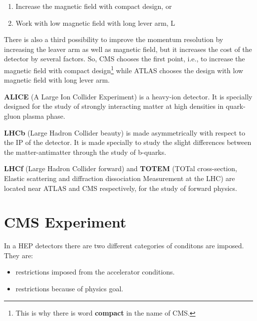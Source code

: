\begin{enumerate}
	\item Increase the magnetic field with compact design, or
	\item Work with low magnetic field with long lever arm, L
\end{enumerate}

There is also a third possibility to improve the momentum resolution by increasing the leaver arm as well as magnetic field, but it increases the cost of the detector by several factors. So, CMS chooses the first point, i.e., to increase the magnetic field with compact design\footnote{This is why there is word {\bf compact} in the name of CMS.} while ATLAS chooses the design with low magnetic field with long lever arm.


{\bf ALICE} (A Large Ion Collider Experiment) is a heavy-ion detector. It is specially designed for the study of strongly interacting matter at high densities in quark-gluon plasma phase.

{\bf LHCb} (Large Hadron Collider beauty) is made asymmetrically with respect to the IP of the detector. It is made specially to study the slight differences between the matter-antimatter through the study of b-quarks.

{\bf LHCf} (Large Hadron Collider forward) and {\bf TOTEM} (TOTal cross-section, Elastic scattering and diffraction dissociation Measurement at the LHC) are located near ATLAS and CMS respectively, for the study of forward physics.

\section{CMS Experiment} %
\label{sec:cms_experiment}
In a HEP detectors there are two different categories of conditons are imposed. They are:

\begin{itemize}
	\item restrictions imposed from the accelerator conditions.
	\item restrictions because of physics goal.
\end{itemize}


